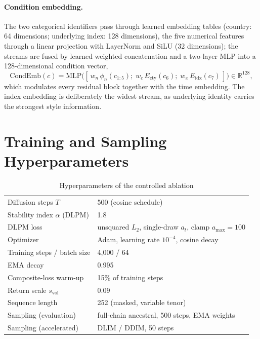 \documentclass[12pt,letterpaper]{article}
\begin{document}
\paragraph{Condition embedding.} The two categorical identifiers pass
through learned embedding tables (country: 64 dimensions; underlying index:
128 dimensions), the five numerical features through a linear projection
with LayerNorm and SiLU (32 dimensions); the streams are fused by learned
weighted concatenation and a two-layer MLP into a 128-dimensional condition
vector,
\begin{equation}
\mathrm{CondEmb}(c) = \mathrm{MLP}\bigl(
[\,w_n\,\phi_n(c_{1:5});\;
  w_c\,E_{\mathrm{cty}}(c_6);\;
  w_x\,E_{\mathrm{idx}}(c_7)\,]\bigr) \in \mathbb{R}^{128},
\end{equation}
which modulates every residual block together with the time embedding. The
index embedding is deliberately the widest stream, as underlying identity
carries the strongest style information.

\section{Training and Sampling Hyperparameters}\label{app:hyper}

\begin{table}[ht]
\singlespacing
\centering
\caption{Hyperparameters of the controlled ablation}
\label{tab:hyper}
\begin{tabular}{ll}
\toprule
Diffusion steps $T$ & 500 (cosine schedule) \\
Stability index $\alpha$ (DLPM) & 1.8 \\
DLPM loss & unsquared $L_2$, single-draw $a_t$, clamp $a_{\max}=100$ \\
Optimizer & Adam, learning rate $10^{-4}$, cosine decay \\
Training steps / batch size & 4{,}000 / 64 \\
EMA decay & 0.995 \\
Composite-loss warm-up & 15\% of training steps \\
Return scale $s_{\mathrm{vol}}$ & 0.09 \\
Sequence length & 252 (masked, variable tenor) \\
Sampling (evaluation) & full-chain ancestral, 500 steps, EMA weights \\
Sampling (accelerated) & DLIM / DDIM, 50 steps \\
\bottomrule
\end{tabular}
\end{table}
\end{document}
